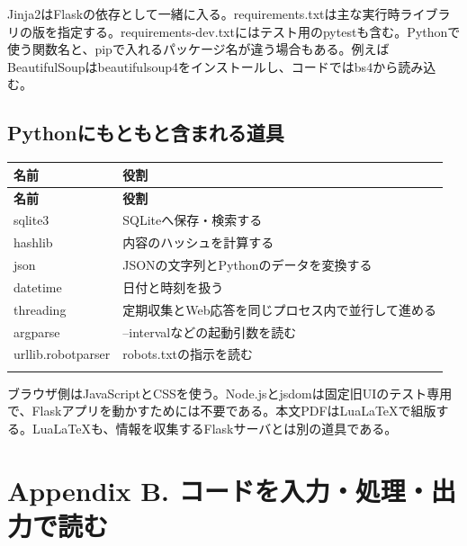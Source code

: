 \documentclass[a4paper,10pt]{ltjsarticle}
\begin{document}
Jinja2はFlaskの依存として一緒に入る。requirements.txtは主な実行時ライブラリの版を指定する。requirements-dev.txtにはテスト用のpytestも含む。Pythonで使う関数名と、pipで入れるパッケージ名が違う場合もある。例えばBeautifulSoupはbeautifulsoup4をインストールし、コードではbs4から読み込む。


\subsection*{Pythonにもともと含まれる道具}

{\small\begin{longtable}{@{}>{\raggedright\arraybackslash}p{}>{\raggedright\arraybackslash}p{}@{}}

\rowcolor{Pale}\textbf{名前} & \textbf{役割} \\ \midrule

\endfirsthead

\rowcolor{Pale}\textbf{名前} & \textbf{役割} \\ \midrule\endhead

sqlite3 & SQLiteへ保存・検索する \\ \addlinespace[3pt]

hashlib & 内容のハッシュを計算する \\ \addlinespace[3pt]

json & JSONの文字列とPythonのデータを変換する \\ \addlinespace[3pt]

datetime & 日付と時刻を扱う \\ \addlinespace[3pt]

threading & 定期収集とWeb応答を同じプロセス内で並行して進める \\ \addlinespace[3pt]

argparse & --intervalなどの起動引数を読む \\ \addlinespace[3pt]

urllib.robotparser & robots.txtの指示を読む \\ \addlinespace[3pt]

\bottomrule\end{longtable}}

ブラウザ側はJavaScriptとCSSを使う。Node.jsとjsdomは固定旧UIのテスト専用で、Flaskアプリを動かすためには不要である。本文PDFはLuaLaTeXで組版する。LuaLaTeXも、情報を収集するFlaskサーバとは別の道具である。


\clearpage

\section*{Appendix B. コードを入力・処理・出力で読む}
\end{document}
